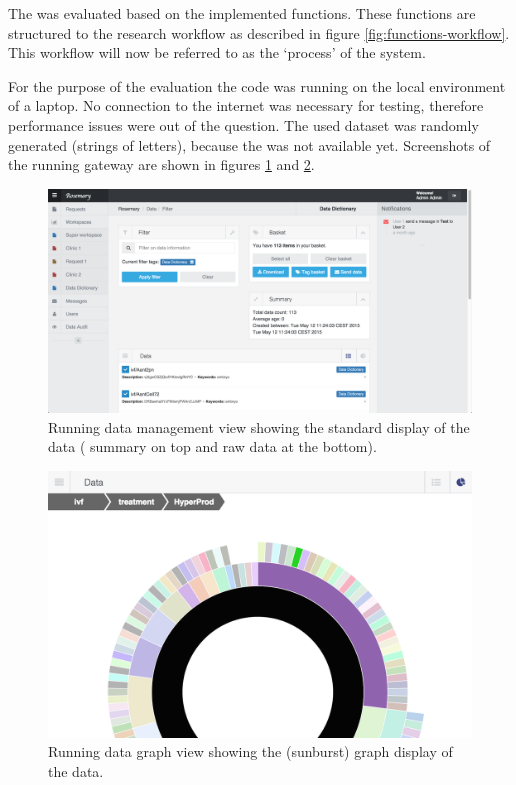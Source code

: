 The \ivfprototype{} was evaluated based on the implemented functions.
These functions are structured to the research workflow as described in figure \ref{fig:functions-workflow}. 
This workflow will now be referred to as the `process' of the system.


For the purpose of the evaluation the \ivfprototype{} code was running on the local environment of a laptop.
No connection to the internet was necessary for testing, therefore performance issues were out of the question.
The used dataset was randomly generated (strings of letters), because the \projectdata{} was not available yet.
Screenshots of the running gateway are shown in figures \ref{fig:standard-view-website} and \ref{fig:sunburst-view-zoom-website}.

\begin{figure}[!b]
	\centering
	\includegraphics[width=1.0\linewidth]{images/standard-view}
	\caption{
		Running \ivfsystem{} data management view showing the standard display of the data (\ie{} summary on top and raw data at the bottom).
	}
	\label{fig:standard-view-website}
\end{figure}

\begin{figure}[ht]
	\centering
	\includegraphics[width=0.7\linewidth]{images/sunburst-closeup}
	\caption{
		Running \ivfsystem{} data graph view showing the (sunburst) graph display of the data.
	}
	\label{fig:sunburst-view-zoom-website}
\end{figure}

